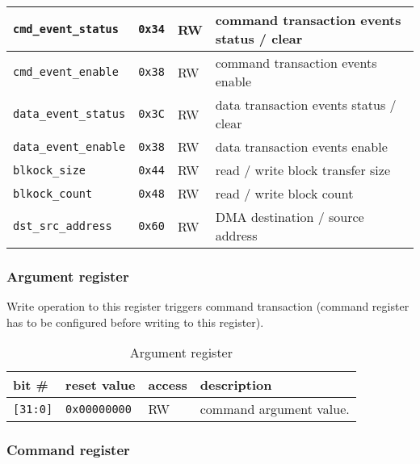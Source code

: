 \begin{table}[H]
\begin{tabular}{l|l|l|l}
                \texttt{cmd\_event\_status} & \texttt{0x34} & RW & command transaction events status / clear \\ \hline
                \texttt{cmd\_event\_enable} & \texttt{0x38} & RW & command transaction events enable \\ \hline
                \texttt{data\_event\_status} & \texttt{0x3C} & RW & data transaction events status / clear \\ \hline
                \texttt{data\_event\_enable} & \texttt{0x38} & RW & data transaction events enable \\ \hline
                \texttt{blkock\_size} & \texttt{0x44} & RW & read / write block transfer size \\ \hline
                \texttt{blkock\_count} & \texttt{0x48} & RW & read / write block count \\ \hline
                \texttt{dst\_src\_address} & \texttt{0x60} & RW & DMA destination / source address \\ \hline
                \hline
        \end{tabular}
        \label{tab:registers}
    \end{table}
    
    \subsubsection{Argument register}
    \label{sec:arg_reg}
    
    Write operation to this register triggers command transaction (command register has to be configured before writing to this register).
    
    \begin{table}[H]
    \caption{Argument register}
        \begin{tabular}{m{1.3cm}|m{2cm}|m{1cm}|m{8cm}}
                \rowcolor[gray]{0.7} bit \# & reset value & access & description \\ \hline \hline
                \texttt{[31:0]} & \texttt{0x00000000} & RW & command argument value. \\ \hline
                \hline
        \end{tabular}
        \label{tab:arg_reg}
    \end{table}
    
    \subsubsection{Command register}
    \label{sec:cmd_reg}
    
